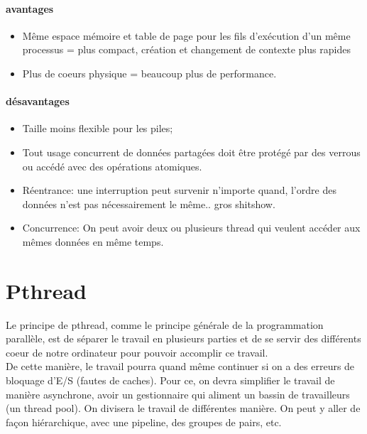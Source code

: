 \documentclass[oneside]{book}
\begin{document}
\paragraph{avantages}
\begin{itemize}
\item Même espace mémoire et table de page pour les fils d'exécution d'un même processus = plus compact, création et changement de contexte plus rapides
\item Plus de coeurs physique = beaucoup plus de performance.
\end{itemize}
\paragraph{désavantages}
\begin{itemize}
\item Taille moins flexible pour les piles;
\item Tout usage concurrent de données partagées doit être protégé par des verrous ou accédé avec des opérations atomiques.
\item Réentrance: une interruption peut survenir n'importe quand, l'ordre des données n'est pas nécessairement le même.. gros shitshow.
\item Concurrence: On peut avoir deux ou plusieurs thread qui veulent accéder aux mêmes données en même temps.
\end{itemize}

\section{Pthread}
Le principe de pthread, comme le principe générale de la programmation parallèle, est de séparer le travail en plusieurs parties et de se servir des différents coeur de notre ordinateur pour pouvoir accomplir ce travail.\\
De cette manière, le travail pourra quand même continuer si on a des erreurs de bloquage d'E/S (fautes de caches). Pour ce, on devra simplifier le travail de manière asynchrone, avoir un gestionnaire qui aliment un bassin de travailleurs (un thread pool). On divisera le travail de différentes manière. On peut y aller de façon hiérarchique, avec une pipeline, des groupes de pairs, etc.
\end{document}
